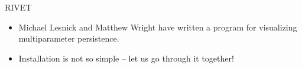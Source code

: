 \begin{frame}{RIVET}
\begin{itemize}
\item<1-> Michael Lesnick and Matthew Wright have written a program for visualizing multiparameter persistence.\cite{lesnick2015interactive}
\item<2-> Installation is not so simple -- let us go through it together!
\end{itemize}
\end{frame}
